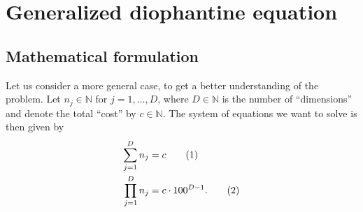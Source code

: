\documentclass[english, parskip=full]{scrartcl}
\newcommand\numberthis{\addtocounter{equation}{1}\tag{\theequation}}
\begin{document}
\section{Generalized diophantine equation}
\subsection{Mathematical formulation}
Let us consider a more general case, to get a better understanding of the problem. Let $n_j\in\mathbb{N}$ for $j=1,\dots,D$, where $D\in\mathbb{N}$ is the number of ``dimensions'' and denote the total ``cost'' by $c\in\mathbb{N}$. The system of equations we want to solve is then given by
\begin{align*}
\sum_{j=1}^Dn_j&=c\numberthis\label{eqn:sum}\\
\prod_{j=1}^Dn_j&=c\cdot 100^{D-1}.\numberthis\label{eqn:product}
\end{align*}
\end{document}

